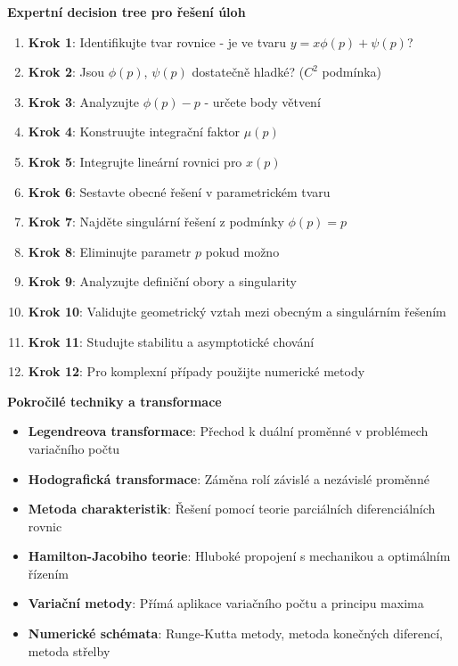 \vspace{1\baselineskip}

\noindent\textbf{Expertní decision tree pro řešení úloh}

\begin{enumerate}
\item \textbf{Krok 1}: Identifikujte tvar rovnice - je ve tvaru $y = x\phi(p) + \psi(p)$?
\item \textbf{Krok 2}: Jsou $\phi(p)$, $\psi(p)$ dostatečně hladké? ($C^2$ podmínka)
\item \textbf{Krok 3}: Analyzujte $\phi(p) - p$ - určete body větvení
\item \textbf{Krok 4}: Konstruujte integrační faktor $\mu(p)$
\item \textbf{Krok 5}: Integrujte lineární rovnici pro $x(p)$
\item \textbf{Krok 6}: Sestavte obecné řešení v parametrickém tvaru
\item \textbf{Krok 7}: Najděte singulární řešení z podmínky $\phi(p) = p$
\item \textbf{Krok 8}: Eliminujte parametr $p$ pokud možno
\item \textbf{Krok 9}: Analyzujte definiční obory a singularity
\item \textbf{Krok 10}: Validujte geometrický vztah mezi obecným a singulárním řešením
\item \textbf{Krok 11}: Studujte stabilitu a asymptotické chování
\item \textbf{Krok 12}: Pro komplexní případy použijte numerické metody
\end{enumerate}

\vspace{1\baselineskip}

\noindent\textbf{Pokročilé techniky a transformace}

\begin{itemize}
\item \textbf{Legendreova transformace}: Přechod k duální proměnné v problémech variačního počtu
\item \textbf{Hodografická transformace}: Záměna rolí závislé a nezávislé proměnné
\item \textbf{Metoda charakteristik}: Řešení pomocí teorie parciálních diferenciálních rovnic
\item \textbf{Hamilton-Jacobiho teorie}: Hluboké propojení s mechanikou a optimálním řízením
\item \textbf{Variační metody}: Přímá aplikace variačního počtu a principu maxima
\item \textbf{Numerické schémata}: Runge-Kutta metody, metoda konečných diferencí, metoda střelby
\end{itemize}

